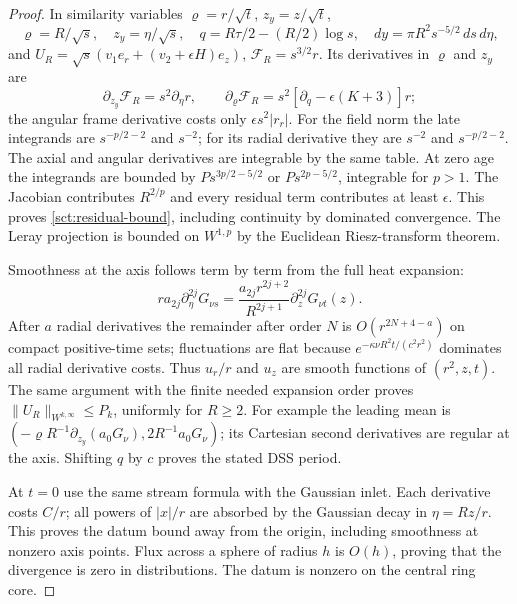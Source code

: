 \begin{proof}
In similarity variables $\varrho=r/\sqrt t$, $z_y=z/\sqrt t$,
\[
 \varrho=R/\sqrt s,\quad z_y=\eta/\sqrt s,\quad
 q=R\tau/2-(R/2)\log s,\quad dy=\pi R^2s^{-5/2}\,ds\,d\eta,
\]
and $U_R=\sqrt s(v_1e_r+(v_2+\epsilon H)e_z)$,
$\mathcal F_R=s^{3/2}r$. Its derivatives in $\varrho$ and $z_y$ are
\[
 \partial_{z_y}\mathcal F_R=s^2\partial_\eta r,
 \qquad\partial_\varrho\mathcal F_R
       =s^2[\partial_q-\epsilon(K+3)]r;
\]
the angular frame derivative costs only $\epsilon s^2|r_r|$.
For the field norm the late integrands are $s^{-p/2-2}$ and $s^{-2}$;
for its radial derivative they are $s^{-2}$ and $s^{-p/2-2}$.
The axial and angular derivatives are integrable by the same table.
At zero age the integrands are bounded by $Ps^{3p/2-5/2}$ or
$Ps^{2p-5/2}$, integrable for $p>1$. The Jacobian contributes
$R^{2/p}$ and every residual term contributes at least $\epsilon$.
This proves \eqref{sct:residual-bound}, including continuity by dominated
convergence. The Leray projection is bounded on $W^{1,p}$ by the
Euclidean Riesz-transform theorem.

Smoothness at the axis follows term by term from the full heat expansion:
\[
 r a_{2j}\partial_\eta^{2j}G_{\nu s}
       =\frac{a_{2j}r^{2j+2}}{R^{2j+1}}
                    \partial_z^{2j}G_{\nu t}(z).
\]
After $a$ radial derivatives the remainder after order $N$ is
$O(r^{2N+4-a})$ on compact positive-time sets; fluctuations are flat
because $e^{-\kappa\nu R^2t/(c^2r^2)}$ dominates all radial derivative
costs. Thus $u_r/r$ and $u_z$ are smooth functions of $(r^2,z,t)$.
The same argument with the finite needed expansion order proves
$\|U_R\|_{W^{k,\infty}}\leq P_k$, uniformly for $R\geq2$.
For example the leading mean is
$(-\varrho R^{-1}\partial_{z_y}(a_0G_\nu),
2R^{-1}a_0G_\nu)$; its Cartesian second derivatives are regular at the axis. Shifting $q$ by $c$ proves the stated DSS period.

At $t=0$ use the same stream formula with the Gaussian inlet. Each
derivative costs $C/r$; all powers of $|x|/r$ are absorbed by the
Gaussian decay in $\eta=Rz/r$. This proves the datum bound away from
the origin, including smoothness at nonzero axis points. Flux across
a sphere of radius $h$ is $O(h)$, proving that the divergence is zero in distributions.
The datum is nonzero on the central ring core.

\end{proof}
